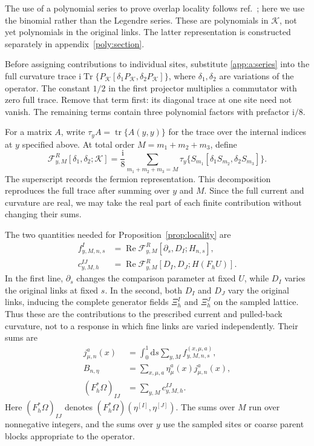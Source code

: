 \documentclass[11pt,a4paper]{article}
\theoremstyle{remark}
\DeclareMathOperator{\Tr}{Tr}
\DeclareMathOperator{\tr}{tr}
\newcommand{\dd}{\mathrm d}
\newcommand{\ii}{\mathrm i}
\begin{document}
The use of a polynomial series to prove overlap locality follows
ref.~\cite{HJL}; here we use the binomial rather than the Legendre
series. These are polynomials in $\mathcal K$, not yet polynomials
in the original links. The latter representation is constructed
separately in appendix~\ref{poly:section}.

Before assigning contributions to individual sites, substitute
\eqref{app:a:series} into the full curvature trace
$\ii\Tr\{P_{\mathcal K}[\delta_1P_{\mathcal K},
\delta_2P_{\mathcal K}]\}$, where $\delta_1,\delta_2$ are
variations of the operator. The constant $1/2$ in the first projector
multiplies a commutator with zero full trace. Remove that term first:
its diagonal trace at one site need not vanish. The remaining terms
contain three polynomial factors with prefactor $\ii/8$.

For a matrix $A$, write $\tau_y A=\tr\{A(y,y)\}$ for the trace
over the internal indices at $y$ specified above. At total order
$M=m_1+m_2+m_3$, define
\begin{equation}
 \mathcal F^R_{y,M}[\delta_1,\delta_2;\mathcal K]
  =\frac{\ii}{8}\sum_{m_1+m_2+m_3=M}
       \tau_y\{S_{m_1}[\delta_1S_{m_2},\delta_2S_{m_3}]\}.
 \label{app:a:diagonal}
\end{equation}
The superscript records the fermion representation. This decomposition
reproduces the full trace after summing over $y$ and $M$. Since the full
current and curvature are real, we may take the real part of each
finite contribution without changing their sums.

The two quantities needed for Proposition~\ref{prop:locality} are
\begin{equation}
 \begin{split}
 f^I_{y,M,n,s}
  &=\operatorname{Re}\mathcal F^R_{y,M}
                     [\partial_s,D_I;H_{n,s}],\\
 c^{IJ}_{y,M,h}
  &=\operatorname{Re}\mathcal F^R_{y,M}
                     [D_I,D_J;H(F_hU)].
 \end{split}
\end{equation}
In the first line, $\partial_s$ changes the comparison parameter at
fixed $U$, while $D_I$ varies the original links at fixed $s$.
In the second, both $D_I$ and $D_J$ vary the original links, inducing
the complete generator fields $\Xi_h^I$ and $\Xi_h^J$ on the
sampled lattice. Thus these are the contributions to the prescribed
current and pulled-back curvature, not to a response in which fine
links are varied independently. Their sums are
\begin{equation}
 \begin{split}
 j_{\mu,n}^a(x)
   &=\int_0^1\!\dd s\sum_{y,M}f^{(x,\mu,a)}_{y,M,n,s},\\
 B_{n,\eta}
   &=\sum_{x,\mu,a}\eta_\mu^a(x)j_{\mu,n}^a(x),\\
 (F_h^*\Omega)_{IJ}
   &=\sum_{y,M}c^{IJ}_{y,M,h}.
 \end{split}
 \label{app:a:current-components}
\end{equation}
Here $(F_h^*\Omega)_{IJ}$ denotes
$(F_h^*\Omega)(\eta^{[I]},\eta^{[J]})$. The sums over $M$ run
over nonnegative integers, and the sums over $y$ use the sampled sites
or coarse parent blocks appropriate to the operator.
\end{document}
